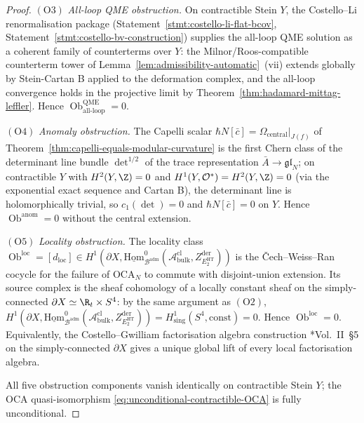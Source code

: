 \begin{proof}
\((\mathrm{O3})\) \emph{All-loop QME obstruction.}
On contractible Stein \(Y\), the Costello--Li renormalisation package
(Statement~\ref{stmt:costello-li-flat-bcov},
Statement~\ref{stmt:costello-bv-construction}) supplies the all-loop
QME solution as a coherent family of counterterms over \(Y\): the
Milnor/Roos-compatible counterterm tower of
Lemma~\ref{lem:admissibility-automatic}~(vii) extends globally by
Stein-Cartan B applied to the deformation complex, and the all-loop
convergence holds in the projective limit by
Theorem~\ref{thm:hadamard-mittag-leffler}.  Hence
\(\operatorname{Ob}^{\mathrm{QME}}_{\mathrm{all\mbox{-}loop}}=0\).

\((\mathrm{O4})\) \emph{Anomaly obstruction.}
The Capelli scalar
\(\hbar N[\bar c]=\Omega_{\mathrm{central}}|_{J(f)}\) of
Theorem~\ref{thm:capelli-equals-modular-curvature} is the first Chern
class of the determinant line bundle \(\det^{1/2}\) of the trace
representation \(\bar A\to\mathfrak{gl}_N\); on contractible \(Y\)
with \(H^2(Y,\Z)=0\) and \(H^1(Y,\mathcal O^*)=
H^2(Y,\Z)=0\) (via the exponential exact sequence and Cartan B),
the determinant line is holomorphically trivial, so
\(c_1(\det)=0\) and \(\hbar N[\bar c]=0\) on \(Y\).  Hence
\(\operatorname{Ob}^{\mathrm{anom}}=0\) without the central extension.

\((\mathrm{O5})\) \emph{Locality obstruction.}
The locality class
\(\operatorname{Ob}^{\mathrm{loc}}=[d_{\mathrm{loc}}]\in
H^1(\partial X,\underline{\mathrm{Hom}}^{0}_{\mathcal B^{\mathrm{adm}}}(
\mathcal A^{\mathrm{cl}}_{\mathrm{bulk}},
Z^{\mathrm{der}}_{E_2^{\mathrm{HT}}}))\) is the
Čech--Weiss--Ran cocycle for the failure of \(\mathrm{OCA}_N\) to
commute with disjoint-union extension.  Its source complex is the
sheaf cohomology of a locally constant sheaf on the simply-connected
\(\partial X\simeq\R_t\times S^4\): by the same argument as
\((\mathrm{O2})\),
\(H^1(\partial X,\underline{\mathrm{Hom}}^{0}_{\mathcal B^{\mathrm{adm}}}(
\mathcal A^{\mathrm{cl}}_{\mathrm{bulk}},
Z^{\mathrm{der}}_{E_2^{\mathrm{HT}}}))=
H^1_{\mathrm{sing}}(S^4,\text{const})=0\).  Hence
\(\operatorname{Ob}^{\mathrm{loc}}=0\).  Equivalently, the
Costello--Gwilliam factorisation algebra construction
\cite{costello-gwilliam}*{Vol.~II~\S 5} on the simply-connected
\(\partial X\) gives a unique global lift of every local factorisation
algebra.

All five obstruction components vanish identically on contractible
Stein \(Y\); the OCA quasi-isomorphism
\eqref{eq:unconditional-contractible-OCA} is fully unconditional.
\end{proof}

